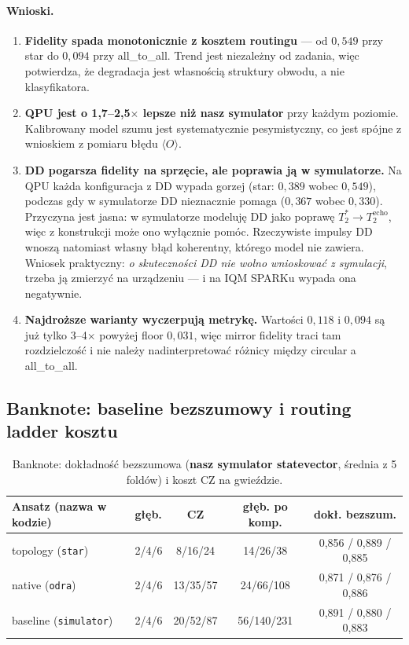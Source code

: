 \documentclass[11pt,a4paper]{article}
\begin{document}
\paragraph{Wnioski.}
\begin{enumerate}
\item \textbf{Fidelity spada monotonicznie z kosztem routingu} --- od $0{,}549$ przy star do
      $0{,}094$ przy all\_to\_all. Trend jest niezależny od zadania, więc potwierdza, że
      degradacja jest własnością struktury obwodu, a nie klasyfikatora.
\item \textbf{QPU jest o 1,7--2,5$\times$ lepsze niż nasz symulator} przy każdym poziomie.
      Kalibrowany model szumu jest systematycznie pesymistyczny, co jest spójne z wnioskiem
      z pomiaru błędu $\langle O\rangle$.
\item \textbf{DD pogarsza fidelity na sprzęcie, ale poprawia ją w symulatorze.} Na QPU każda konfiguracja z DD wypada gorzej
      (star: $0{,}389$ wobec $0{,}549$), podczas gdy w symulatorze DD nieznacznie pomaga
      ($0{,}367$ wobec $0{,}330$). Przyczyna jest jasna: w symulatorze modeluję DD jako
      poprawę $T_2^{*}\to T_2^{\text{echo}}$, więc z konstrukcji może ono wyłącznie pomóc.
      Rzeczywiste impulsy DD wnoszą natomiast własny błąd koherentny, którego model nie
      zawiera. Wniosek praktyczny: \emph{o skuteczności DD nie wolno wnioskować z symulacji},
      trzeba ją zmierzyć na urządzeniu --- i na IQM SPARKu wypada ona negatywnie.
\item \textbf{Najdroższe warianty wyczerpują metrykę.} Wartości $0{,}118$ i $0{,}094$ są już
      tylko 3--4$\times$ powyżej floor $0{,}031$, więc mirror fidelity traci tam
      rozdzielczość i nie należy nadinterpretować różnicy między circular a all\_to\_all.
\end{enumerate}

\subsection{Banknote: baseline bezszumowy i routing ladder kosztu}

\begin{table}[htbp]
\centering
\caption{Banknote: dokładność bezszumowa (\textbf{nasz symulator statevector}, średnia z
5 foldów) i koszt CZ na gwieździe.}
\begin{tabular}{@{}llccc@{}}
\toprule
Ansatz (nazwa w kodzie) & głęb. & CZ & głęb. po komp. & dokł. bezszum. \\
\midrule
topology (\texttt{star})      & 2/4/6 & 8/16/24  & 14/26/38   & 0,856 / 0,889 / 0,885 \\
native (\texttt{odra})        & 2/4/6 & 13/35/57 & 24/66/108  & 0,871 / 0,876 / 0,886 \\
baseline (\texttt{simulator}) & 2/4/6 & 20/52/87 & 56/140/231 & 0,891 / 0,880 / 0,883 \\
\bottomrule
\end{tabular}
\end{table}
\end{document}
